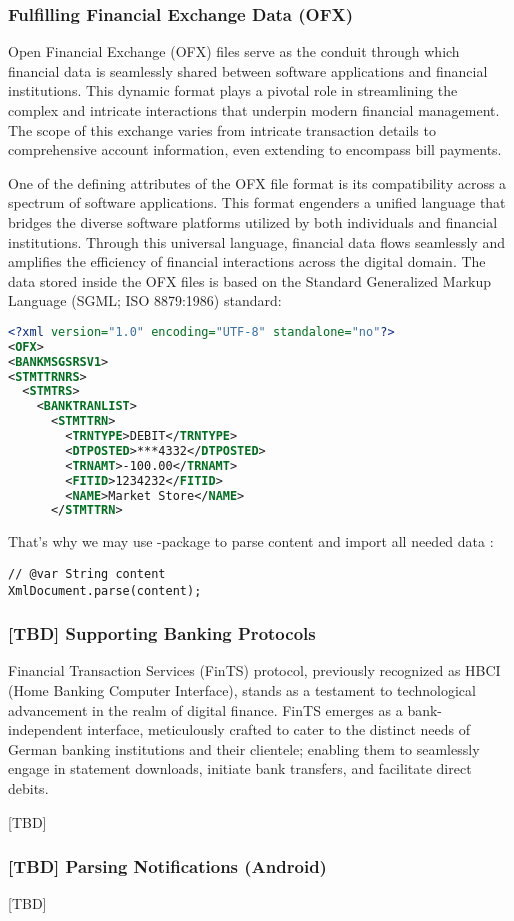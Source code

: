 \subsubsection{Fulfilling Financial Exchange Data (OFX)}

Open Financial Exchange (OFX) files serve as the conduit through which financial data is seamlessly shared between 
software applications and financial institutions. This dynamic format plays a pivotal role in streamlining the complex 
and intricate interactions that underpin modern financial management. The scope of this exchange varies from intricate 
transaction details to comprehensive account information, even extending to encompass bill payments.

One of the defining attributes of the OFX file format is its compatibility across a spectrum of software applications. 
This format engenders a unified language that bridges the diverse software platforms utilized by both individuals and 
financial institutions. Through this universal language, financial data flows seamlessly and amplifies the efficiency 
of financial interactions across the digital domain. The data stored inside the OFX files is based on the Standard 
Generalized Markup Language (SGML; ISO 8879:1986) standard:

\begin{lstlisting}[language=xml]
<?xml version="1.0" encoding="UTF-8" standalone="no"?>
<OFX>
<BANKMSGSRSV1>
<STMTTRNRS>
  <STMTRS>
    <BANKTRANLIST>
      <STMTTRN>
        <TRNTYPE>DEBIT</TRNTYPE>
        <DTPOSTED>***4332</DTPOSTED>
        <TRNAMT>-100.00</TRNAMT>
        <FITID>1234232</FITID>
        <NAME>Market Store</NAME>
      </STMTTRN>
\end{lstlisting}

\noindent That's why we may use -package to parse content and import all needed data :

\begin{lstlisting}
// @var String content
XmlDocument.parse(content);
\end{lstlisting}


\subsubsection{[TBD] Supporting Banking Protocols}

Financial Transaction Services (FinTS) protocol, previously recognized as HBCI (Home Banking Computer Interface), stands 
as a testament to technological advancement in the realm of digital finance. FinTS emerges as a bank-independent 
interface, meticulously crafted to cater to the distinct needs of German banking institutions and their clientele;
enabling them to seamlessly engage in statement downloads, initiate bank transfers, and facilitate direct debits.

[TBD]

\subsubsection{[TBD] Parsing Notifications (Android)}

[TBD]